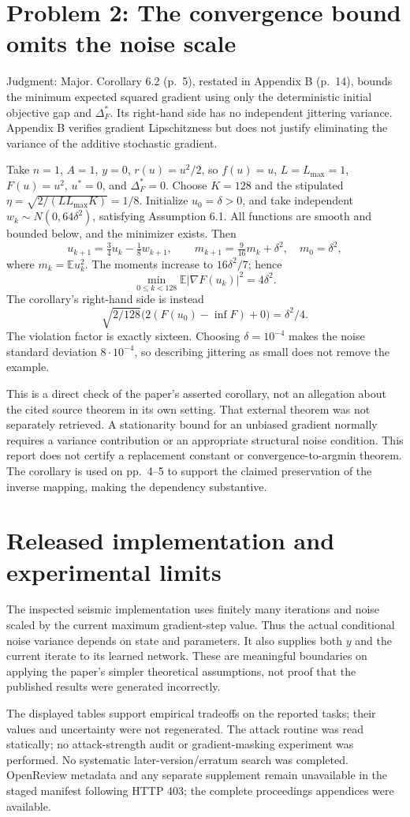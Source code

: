 \documentclass[10pt]{article}
\begin{document}
\section*{Problem 2: The convergence bound omits the noise scale}
Judgment: Major. Corollary 6.2 (p. 5), restated in Appendix B (p. 14), bounds the minimum expected squared gradient using only the deterministic initial objective gap and \(\Delta_F^*\). Its right-hand side has no independent jittering variance. Appendix B verifies gradient Lipschitzness but does not justify eliminating the variance of the additive stochastic gradient.\par
Take \(n=1\), \(A=1\), \(y=0\), \(r(u)=u^2/2\), so \(f(u)=u\), \(L=L_{\max}=1\), \(F(u)=u^2\), \(u^*=0\), and \(\Delta_F^*=0\). Choose \(K=128\) and the stipulated \(\eta=\sqrt{2/(LL_{\max}K)}=1/8\). Initialize \(u_0=\delta>0\), and take independent \(w_k\sim N(0,64\delta^2)\), satisfying Assumption 6.1. All functions are smooth and bounded below, and the minimizer exists. Then \[u_{k+1}=\tfrac34u_k-\tfrac18w_{k+1},\qquad
 m_{k+1}=\tfrac9{16}m_k+\delta^2,\quad m_0=\delta^2,\] where \(m_k=\mathbb E u_k^2\). The moments increase to \(16\delta^2/7\); hence \[\min_{0\le k<128}\mathbb E|\nabla F(u_k)|^2=4\delta^2.\] The corollary’s right-hand side is instead \[\sqrt{2/128}\bigl(2(F(u_0)-\inf F)+0\bigr)=\delta^2/4.\] The violation factor is exactly sixteen. Choosing \(\delta=10^{-4}\) makes the noise standard deviation \(8\cdot10^{-4}\), so describing jittering as small does not remove the example.\par
This is a direct check of the paper’s asserted corollary, not an allegation about the cited source theorem in its own setting. That external theorem was not separately retrieved. A stationarity bound for an unbiased gradient normally requires a variance contribution or an appropriate structural noise condition. This report does not certify a replacement constant or convergence-to-argmin theorem. The corollary is used on pp. 4–5 to support the claimed preservation of the inverse mapping, making the dependency substantive.\par
\section*{Released implementation and experimental limits}
The inspected seismic implementation uses finitely many iterations and noise scaled by the current maximum gradient-step value. Thus the actual conditional noise variance depends on state and parameters. It also supplies both \(y\) and the current iterate to its learned network. These are meaningful boundaries on applying the paper’s simpler theoretical assumptions, not proof that the published results were generated incorrectly.\par
The displayed tables support empirical tradeoffs on the reported tasks; their values and uncertainty were not regenerated. The attack routine was read statically; no attack-strength audit or gradient-masking experiment was performed. No systematic later-version/erratum search was completed. OpenReview metadata and any separate supplement remain unavailable in the staged manifest following HTTP 403; the complete proceedings appendices were available.\par
\end{document}
